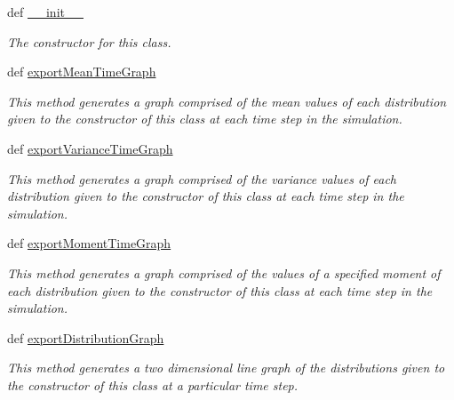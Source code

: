 \begin{DoxyCompactItemize}
\item 
def \hyperlink{class_distribution_data_visualiser_1_1_distribution_data_visualiser_adef16beac816563cca4db0c2a8deef73}{\_\-\_\-init\_\-\_\-}
\begin{DoxyCompactList}\small\item\em The constructor for this class. \item\end{DoxyCompactList}\item 
def \hyperlink{class_distribution_data_visualiser_1_1_distribution_data_visualiser_afd5e7b189ddc9d35884acc9ea8f62b10}{exportMeanTimeGraph}
\begin{DoxyCompactList}\small\item\em This method generates a graph comprised of the mean values of each distribution given to the constructor of this class at each time step in the simulation. \item\end{DoxyCompactList}\item 
def \hyperlink{class_distribution_data_visualiser_1_1_distribution_data_visualiser_a7ce1b532faa77577fdafb8512943c922}{exportVarianceTimeGraph}
\begin{DoxyCompactList}\small\item\em This method generates a graph comprised of the variance values of each distribution given to the constructor of this class at each time step in the simulation. \item\end{DoxyCompactList}\item 
def \hyperlink{class_distribution_data_visualiser_1_1_distribution_data_visualiser_aa43de9f8adeeacc13306f1fbe67cee1b}{exportMomentTimeGraph}
\begin{DoxyCompactList}\small\item\em This method generates a graph comprised of the values of a specified moment of each distribution given to the constructor of this class at each time step in the simulation. \item\end{DoxyCompactList}\item 
def \hyperlink{class_distribution_data_visualiser_1_1_distribution_data_visualiser_af94d7669b055348a4c702ea452e7bec7}{exportDistributionGraph}
\begin{DoxyCompactList}\small\item\em This method generates a two dimensional line graph of the distributions given to the constructor of this class at a particular time step. \item\end{DoxyCompactList}\item 

\end{DoxyCompactItemize}
